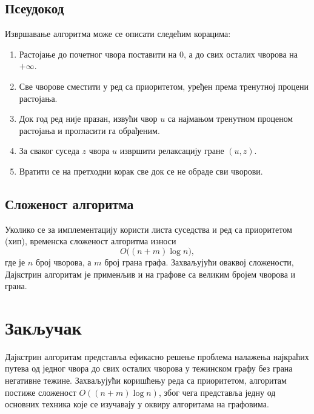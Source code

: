 \documentclass{article}
\theoremstyle{definition}
\begin{document}
\subsection{Псеудокод}

Извршавање алгоритма може се описати следећим корацима:

\begin{enumerate}
\item Растојање до почетног чвора поставити на $0$, а до свих осталих чворова на $+\infty$.
\item Све чворове сместити у ред са приоритетом, уређен према тренутној процени растојања.
\item Док год ред није празан, извући чвор $u$ са најмањом тренутном проценом растојања и прогласити га обрађеним.
\item За сваког суседа $z$ чвора $u$ извршити релаксацију гране $(u, z)$.
\item Вратити се на претходни корак све док се не обраде сви чворови.
\end{enumerate}

\subsection{Сложеност алгоритма}

Уколико се за имплементацију користи листа суседства и ред са приоритетом (хип), временска сложеност алгоритма износи $$O\big((n+m)\log n\big),$$ где је $n$ број чворова, а $m$ број грана графа. Захваљујући оваквој сложености, Дајкстрин алгоритам је применљив и на графове са великим бројем чворова и грана.

\section*{Закључак}

Дајкстрин алгоритам представља ефикасно решење проблема налажења најкраћих путева од једног чвора до свих осталих чворова у тежинском графу без грана негативне тежине. Захваљујући коришћењу реда са приоритетом, алгоритам постиже сложеност $O((n+m)\log n)$, због чега представља једну од основних техника које се изучавају у оквиру алгоритама на графовима.
\end{document}
